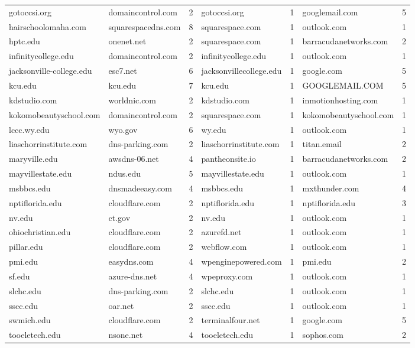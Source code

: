 \begin{tabular}{l l r l r l r}
gotoccsi.org & domaincontrol.com & 2 & gotoccsi.org & 1 & googlemail.com & 5 \\
hairschoolomaha.com & squarespacedns.com & 8 & squarespace.com & 1 & outlook.com & 1 \\
hptc.edu & onenet.net & 2 & squarespace.com & 1 & barracudanetworks.com & 2 \\
infinitycollege.edu & domaincontrol.com & 2 & infinitycollege.edu & 1 & outlook.com & 1 \\
jacksonville-college.edu & esc7.net & 6 & jacksonvillecollege.edu & 1 & google.com & 5 \\
kcu.edu & kcu.edu & 7 & kcu.edu & 1 & GOOGLEMAIL.COM & 5 \\
kdstudio.com & worldnic.com & 2 & kdstudio.com & 1 & inmotionhosting.com & 1 \\
kokomobeautyschool.com & domaincontrol.com & 2 & squarespace.com & 1 & kokomobeautyschool.com & 1 \\
lccc.wy.edu & wyo.gov & 6 & wy.edu & 1 & outlook.com & 1 \\
liaschorrinstitute.com & dns-parking.com & 2 & liaschorrinstitute.com & 1 & titan.email & 2 \\
maryville.edu & awsdns-06.net & 4 & pantheonsite.io & 1 & barracudanetworks.com & 2 \\
mayvillestate.edu & ndus.edu & 5 & mayvillestate.edu & 1 & outlook.com & 1 \\
msbbcs.edu & dnsmadeeasy.com & 4 & msbbcs.edu & 1 & mxthunder.com & 4 \\
nptiflorida.edu & cloudflare.com & 2 & nptiflorida.edu & 1 & nptiflorida.edu & 3 \\
nv.edu & ct.gov & 2 & nv.edu & 1 & outlook.com & 1 \\
ohiochristian.edu & cloudflare.com & 2 & azurefd.net & 1 & outlook.com & 1 \\
pillar.edu & cloudflare.com & 2 & webflow.com & 1 & outlook.com & 1 \\
pmi.edu & easydns.com & 4 & wpenginepowered.com & 1 & pmi.edu & 2 \\
sf.edu & azure-dns.net & 4 & wpeproxy.com & 1 & outlook.com & 1 \\
slchc.edu & dns-parking.com & 2 & slchc.edu & 1 & outlook.com & 1 \\
sscc.edu & oar.net & 2 & sscc.edu & 1 & outlook.com & 1 \\
swmich.edu & cloudflare.com & 2 & terminalfour.net & 1 & google.com & 5 \\
tooeletech.edu & nsone.net & 4 & tooeletech.edu & 1 & sophos.com & 2 \\

\end{tabular}
